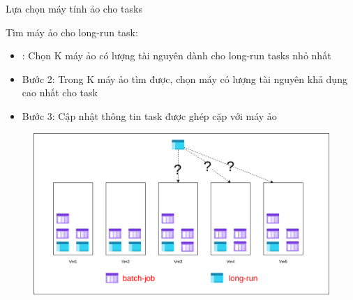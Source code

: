 \documentclass[11pt,xcolor={dvipsnames}, aspectratio=169]{beamer}
\begin{document}
\begin{frame}
{Lựa chọn máy tính ảo cho tasks}

	\begin{minipage}[t]{0.4\linewidth}
		\vspace{0.5cm}
		Tìm máy ảo cho long-run task: 
		\begin{itemize}
			\item {\color{red}{Bước 1}}: Chọn K máy ảo có lượng tài nguyên dành cho long-run tasks nhỏ nhất 
			\item Bước 2: Trong K máy ảo tìm được, chọn máy có lượng tài nguyên khả dụng cao nhất cho task 
			\item Bước 3: Cập nhật thông tin task được ghép cặp với máy ảo
		\end{itemize}
	\end{minipage}
	\hfill
	\begin{minipage}[t]{0.59\linewidth}
	\begin{figure}
		\vspace{1cm}
		\includegraphics[scale=0.35]{images/balancing_tasks3.png}
	\end{figure}
	\vspace{1cm}
	\end{minipage}
\end{frame}
\end{document}
